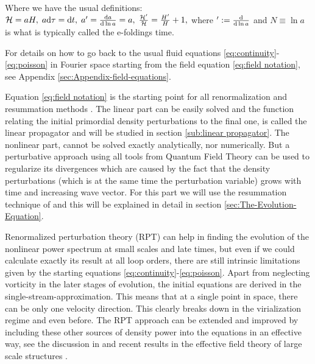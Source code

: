 Where we have the usual definitions: $\mathcal{H}=aH,\; a\mbox{d}\tau=\mbox{d}t,\; a'=\frac{\mathrm{d}a}{\mathrm{d}\ln a}=a,\;\frac{\mathcal{H}'}{\mathcal{H}}=\frac{H'}{H}+1,$
where $':=\frac{\mathrm{d}}{\mathrm{d}\ln a}$ and $N\equiv\ln a$ is what is typically
called the e-foldings time.

For details on how to go back to the usual fluid equations \ref{eq:continuity}-\ref{eq:poisson}
in Fourier space starting from the field equation \ref{eq:field notation},
see Appendix \ref{sec:Appendix-field-equations}.

Equation \ref{eq:field notation} is the starting point for all renormalization
and resummation methods \cite{crocce_renormalized_2005,bernardeau_evolution_2013,bernardeau_constructing_2012,valageas_matter_2013,anselmi_nonlinear_2012,anselmi_next--leading_2010}.
The linear part can be easily solved and the function relating the
initial primordial density perturbations to the final one, is called
the linear propagator and will be studied in section \ref{sub:linear propagator}.
The nonlinear part, cannot be solved exactly analytically, nor numerically.
But a perturbative approach using all tools from Quantum Field Theory
can be used to regularize its divergences which are caused by the
fact that the density perturbations (which is at the same time the
perturbation variable) grows with time and increasing wave vector.
For this part we will use the resummation technique of \cite{anselmi_nonlinear_2012}
and this will be explained in detail in section \ref{sec:The-Evolution-Equation}.

Renormalized perturbation theory (RPT) can help in finding the evolution
of the nonlinear power spectrum at small scales and late times, but
even if we could calculate exactly its result at all loop orders,
there are still intrinsic limitations given by the starting equations
\ref{eq:continuity}-\ref{eq:poisson}. Apart from neglecting vorticity
in the later stages of evolution, the initial equations are derived
in the single-stream-approximation. This means that at a single point
in space, there can be only one velocity direction. This clearly breaks
down in the virialization regime and even before. The RPT approach
can be extended and improved by including these other sources of density
power into the equations in an effective way, see the discussion in
\cite{manzotti_coarse_2014,pietroni_coarse-grained_2011} and recent
results in the effective field theory of large scale structures \cite{baumann_cosmological_2012,pajer_renormalization_2013,senatore_ir-resummed_2014,carrasco_effective_2012}.


